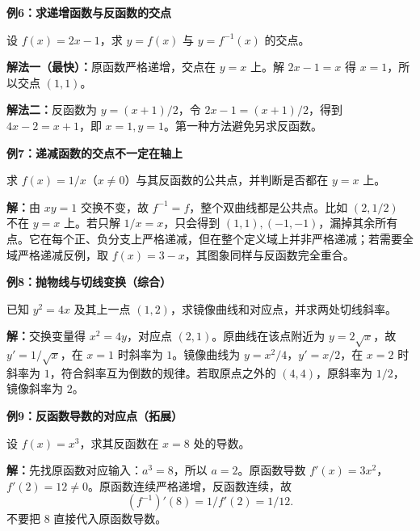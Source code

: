 \clearpage
\begin{examplebox}
\textbf{\textcolor{CExample}{例6：求递增函数与反函数的交点}}


设 $f(x)=2x-1$，求 $y=f(x)$ 与 $y=f^{-1}(x)$ 的交点。

\textbf{解法一（最快）：}原函数严格递增，交点在 $y=x$ 上。解 $2x-1=x$ 得 $x=1$，所以交点 $\boxed{(1,1)}$。

\textbf{解法二：}反函数为 $y=(x+1)/2$，令 $2x-1=(x+1)/2$，得到 $4x-2=x+1$，即 $x=1,y=1$。第一种方法避免另求反函数。
\end{examplebox}
\clearpage
\begin{examplebox}
\textbf{\textcolor{CExample}{例7：递减函数的交点不一定在轴上}}


求 $f(x)=1/x$（$x\ne0$）与其反函数的公共点，并判断是否都在 $y=x$ 上。

\textbf{解：}由 $xy=1$ 交换不变，故 $f^{-1}=f$，整个双曲线都是公共点。比如 $(2,1/2)$ 不在 $y=x$ 上。若只解 $1/x=x$，只会得到 $(1,1),(-1,-1)$，漏掉其余所有点。它在每个正、负分支上严格递减，但在整个定义域上并非严格递减；若需要全域严格递减反例，取 $f(x)=3-x$，其图象同样与反函数完全重合。
\end{examplebox}
\clearpage
\begin{examplebox}
\textbf{\textcolor{CExample}{例8：抛物线与切线变换（综合）}}


已知 $y^2=4x$ 及其上一点 $(1,2)$，求镜像曲线和对应点，并求两处切线斜率。

\textbf{解：}交换变量得 $x^2=4y$，对应点 $(2,1)$。原曲线在该点附近为 $y=2\sqrt{x}$，故 $y'=1/\sqrt{x}$，在 $x=1$ 时斜率为 $1$。镜像曲线为 $y=x^2/4$，$y'=x/2$，在 $x=2$ 时斜率为 $1$，符合斜率互为倒数的规律。若取原点之外的 $(4,4)$，原斜率为 $1/2$，镜像斜率为 $2$。
\end{examplebox}
\clearpage
\begin{examplebox}
\textbf{\textcolor{CExample}{例9：反函数导数的对应点（拓展）}}


设 $f(x)=x^3$，求其反函数在 $x=8$ 处的导数。

\textbf{解：}先找原函数对应输入：$a^3=8$，所以 $a=2$。原函数导数 $f'(x)=3x^2$，$f'(2)=12\ne0$。原函数连续严格递增，反函数连续，故
\[
\boxed{(f^{-1})'(8)=1/f'(2)=1/12}.
\]
不要把 $8$ 直接代入原函数导数。
\end{examplebox}
